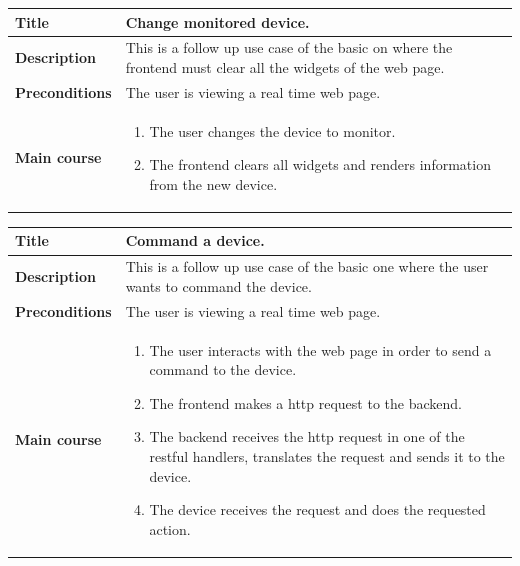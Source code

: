 \documentclass[12pt]{article}
\begin{document}
            \begin{tabularx}{\textwidth}{|l|X|}
                \hline
                \textbf{Title} & Change monitored device.\\
                \hline
                \textbf{Description} & This is a follow up use case of the basic
                on where the frontend must clear all the widgets of the web
                page. \\
                \hline
                \textbf{Preconditions} & The user is viewing a real time web
                page.\\
                \hline
                \textbf{Main course} &
                    \begin{enumerate}
                        \item The user changes the device to monitor.
                        \item The frontend clears all widgets and renders
                              information from the new device.
                    \end{enumerate}\\
                \hline
            \end{tabularx}

            \begin{tabularx}{\textwidth}{|l|X|}
                \hline
                \textbf{Title} & Command a device.\\
                \hline
                \textbf{Description} & This is a follow up use case of the basic
                one where the user wants to command the device.\\
                \hline
                \textbf{Preconditions} & The user is viewing a real time web
                page.\\
                \hline
                \textbf{Main course} &
                    \begin{enumerate}
                        \item The user interacts with the web page in order to
                              send a command to the device.
                        \item The frontend makes a http request to the backend.
                        \item The backend receives the http request in one of
                              the restful handlers, translates the request and
                              sends it to the device.
                        \item The device receives the request and does the
                              requested action.
                    \end{enumerate}\\
                \hline
            \end{tabularx}
\end{document}
